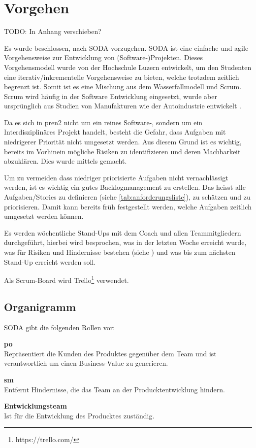 \newpage

\section{Vorgehen}

TODO: In Anhang verschieben?

Es wurde beschlossen, nach SODA \cite{HSLU-Education-SODA} vorzugehen.
SODA ist eine einfache und agile Vorgehensweise zur Entwicklung von (Software-)Projekten. Dieses Vorgehensmodell wurde von der Hochschule Luzern entwickelt, um den Studenten eine iterativ/inkrementelle Vorgehensweise zu bieten, welche trotzdem zeitlich begrenzt ist. Somit ist es eine Mischung aus dem Wasserfallmodell und Scrum. Scrum wird häufig in der Software Entwicklung eingesetzt, wurde aber ursprünglich aus Studien von Manufakturen wie der Autoindustrie entwickelt \cite{Wikipedia-Scrum-History}.

Da es sich in \acrshort{pren2} nicht um ein reines Software-, sondern um
ein Interdisziplinäres Projekt handelt, besteht die Gefahr, dass Aufgaben
mit niedrigerer Priorität nicht umgesetzt werden. Aus diesem Grund ist es
wichtig, bereits im Vorhinein mögliche Risiken zu identifizieren und deren Machbarkeit
abzuklären. Dies wurde mittels  gemacht.

Um zu vermeiden dass niedriger priorisierte Aufgaben nicht vernachlässigt werden,
ist es wichtig ein gutes Backlogmanagement zu erstellen. Das heisst alle Aufgaben/Stories zu definieren (siehe \ref{tab:anforderungsliste}), zu schätzen und zu priorisieren. Damit kann bereits früh festgestellt werden, welche Aufgaben zeitlich umgesetzt werden können.

Es werden wöchentliche Stand-Ups mit dem Coach und allen Teammitgliedern durchgeführt, hierbei wird besprochen, was in der letzten Woche erreicht wurde, was für Risiken und Hindernisse bestehen (siehe ) und was bis zum nächsten Stand-Up erreicht werden soll.

Als Scrum-Board wird Trello\footnote{https://trello.com/} verwendet.

\newpage

\subsection{Organigramm}
SODA gibt die folgenden Rollen vor:

\begin{items}
  \item {\bf \acrfull{po}} \\
    Repräsentiert die Kunden des Produktes gegenüber dem Team 
    und ist verantwortlich um einen Business-Value zu generieren.
  \item {\bf \acrfull{sm}} \\
    Entfernt Hindernisse, die das Team an der Producktentwicklung hindern.
  \item {\bf Entwicklungsteam} \\
    Ist für die Entwicklung des Producktes zuständig.
\end{items}

